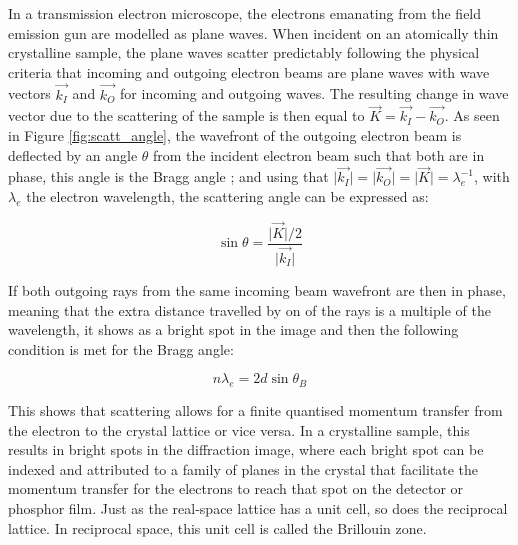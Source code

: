 In a transmission electron microscope, the electrons emanating from the field emission gun are modelled as plane waves. When incident on an atomically thin crystalline sample, the plane waves scatter predictably following the physical criteria that incoming and outgoing electron beams are plane waves with wave vectors $\vec{k_I}$ and $\vec{k_O}$ for incoming and outgoing waves. The resulting change in wave vector due to the scattering of the sample is then equal to $\vec{K} = \vec{k_I}-\vec{k_O}$. As seen in Figure \ref{fig:scatt_angle}, the wavefront of the outgoing electron beam is deflected by an angle $\theta$ from the incident electron beam such that both are in phase, this angle is the Bragg angle \cite{Williams2009-ww}; and using that $\vert \vec{k_I} \vert = \vert \vec{k_O} \vert = \vert \vec{K} \vert =\lambda_e^{-1}$, with $\lambda_e$ the electron wavelength, the scattering angle can be expressed as:

\begin{equation}
    \sin{\theta}=\frac{\vert \vec{K}\vert / 2}{\vert \vec{k_I}\vert}
    \label{eq:bragg_angle}
\end{equation}

If both outgoing rays from the same incoming beam wavefront are then in phase, meaning that the extra distance travelled by on of the rays is a multiple of the wavelength, it shows as a bright spot in the image and then the following condition is met for the Bragg angle:

\begin{equation}
    n \lambda_e = 2 d \sin{\theta_B}
    \label{eq:bragg_angle_ser}
\end{equation}

This shows that scattering allows for a finite quantised momentum transfer from the electron to the crystal lattice or vice versa. In a crystalline sample, this results in bright spots in the diffraction image, where each bright spot can be indexed and attributed to a family of planes in the crystal that facilitate the momentum transfer for the electrons to reach that spot on the detector or phosphor film.
Just as the real-space lattice has a unit cell, so does the reciprocal lattice. In reciprocal space, this unit cell is called the Brillouin zone.



